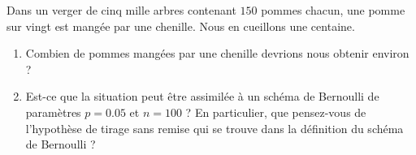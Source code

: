 
\begin{exercice}\label{exoPremiere-0082}

    Dans un verger de cinq mille arbres contenant \( 150\) pommes chacun, une pomme sur vingt est mangée par une chenille. Nous en cueillons une centaine.
    \begin{enumerate}
        \item
            Combien de pommes mangées par une chenille devrions nous obtenir environ ?
        \item
            Est-ce que la situation peut être assimilée à un schéma de Bernoulli de paramètres \( p=0.05\) et \( n=100\) ? En particulier, que pensez-vous de l'hypothèse de tirage sans remise qui se trouve dans la définition du schéma de Bernoulli ?
    \end{enumerate}

\end{exercice}
